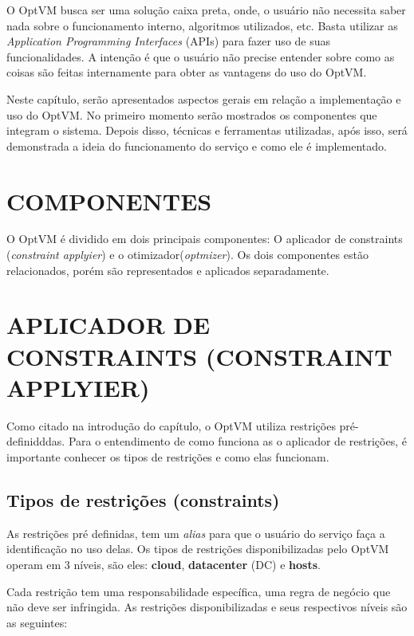 O OptVM busca ser uma solução caixa preta, onde, o usuário não necessita saber nada sobre o funcionamento interno, 
algoritmos utilizados, etc. Basta utilizar as \textit{Application Programming Interfaces} (APIs) para fazer uso de suas funcionalidades.
A intenção é que o usuário não precise entender sobre como as coisas são feitas internamente para obter as vantagens do uso do OptVM.

Neste capítulo, serão apresentados aspectos gerais em relação a implementação e uso do OptVM. 
No primeiro momento serão mostrados os componentes que integram o sistema. 
Depois disso, técnicas e ferramentas utilizadas, após isso, será demonstrada a ideia do funcionamento do serviço e como ele é
implementado.

\section{COMPONENTES}
O OptVM é dividido em dois principais componentes: O aplicador de constraints (\textit{constraint applyier})
e o otimizador(\textit{optmizer}). Os dois componentes estão relacionados, porém são representados e 
aplicados separadamente. 

\section{APLICADOR DE CONSTRAINTS (CONSTRAINT APPLYIER)}

Como citado na introdução do capítulo, o OptVM utiliza restrições pré-definidddas.
Para o entendimento de como funciona as o aplicador de restrições, é importante conhecer os tipos de 
restrições e como elas funcionam.

\subsection{Tipos de restrições (constraints)}

As restrições pré definidas, tem um \textit{alias} para que o usuário do serviço faça a identificação no uso delas.
Os tipos de restrições disponibilizadas pelo OptVM operam em 3 níveis, são eles: \textbf{cloud}, \textbf{datacenter} (DC)
e \textbf{hosts}.

Cada restrição tem uma responsabilidade específica, uma regra de negócio que não deve ser infringida. 
As restrições disponibilizadas e seus respectivos níveis são as seguintes:

